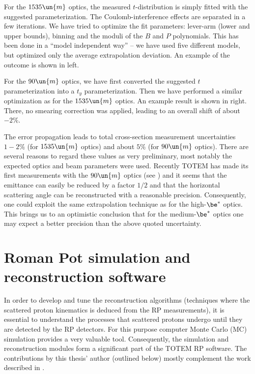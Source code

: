 For the $1535\un{m}$ optics, the measured $t$-distribution is simply fitted with the suggested parameterization. The Coulomb-interference effects are separated in a few iterations. We have tried to optimize the fit parameters: lever-arm (lower and upper bounds), binning and the moduli of the $B$ and $P$ polynomials. This has been done in a ``model independent way'' -- we have used five different models, but optimized only the average extrapolation deviation. An example of the outcome is shown in  left.

For the $90\un{m}$ optics, we have first converted the suggested $t$ parameterization into a $t_y$ parameterization. Then we have performed a similar optimization as for the $1535\un{m}$ optics. An example result is shown in  right. There, no smearing correction was applied, leading to an overall shift of about $-2\%$.


The error propagation leads to total cross-section measurement uncertainties $1-2\%$ (for $1535\un{m}$ optics) and about $5\%$ (for $90\un{m}$ optics). There are several reasons to regard these values as very preliminary, most notably the expected optics and beam parameters were used. Recently TOTEM has made its first measurements with the $90\un{m}$ optics (see ) and it seems that the emittance can easily be reduced by a factor $1/2$ and that the horizontal scattering angle can be reconstructed with a reasonable precision. Consequently, one could exploit the same extrapolation technique as for the high-$\be^*$ optics. This brings us to an optimistic conclusion that for the medium-$\be^*$ optics one may expect a better precision than the above quoted uncertainty.



\chapter[sr]{Roman Pot simulation and reconstruction software}

In order to develop and tune the reconstruction algorithms (techniques where the scattered proton kinematics is deduced from the RP measurements), it is essential to understand the processes that scattered protons undergo until they are detected by the RP detectors. For this purpose computer Monte Carlo (MC) simulation provides a very valuable tool. Consequently, the simulation and reconstruction modules form a significant part of the TOTEM RP software. The contributions by this thesis' author (outlined below) mostly complement the work described in .

